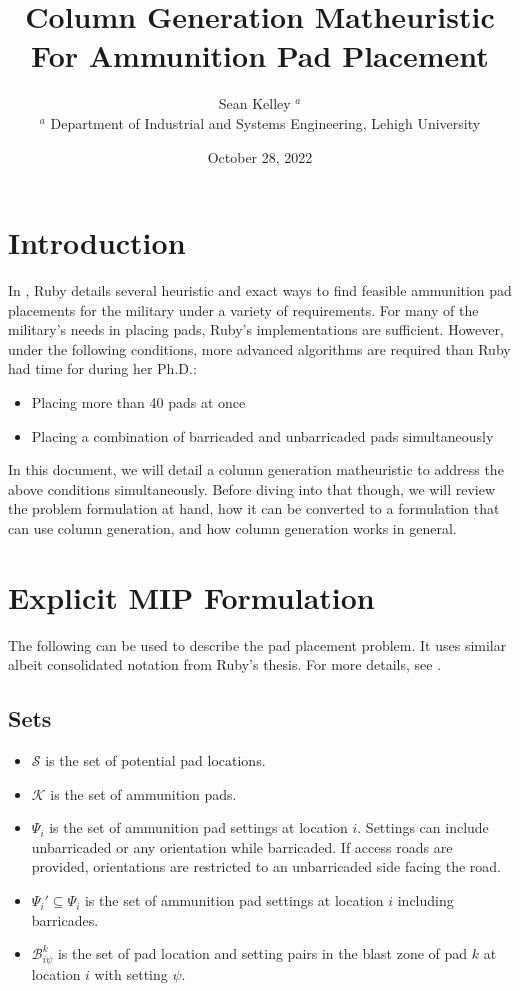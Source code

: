 \documentclass[10pt]{article}
\begin{document}
	\title{Column Generation Matheuristic For Ammunition Pad Placement}
	\author{Sean Kelley $^a$ \\
		$^a$ Department of Industrial and Systems Engineering, Lehigh University}
	\date{October 28, 2022}
	\maketitle
	
	\section{Introduction}
	In \cite{ruby}, Ruby details several heuristic and exact ways to find feasible ammunition pad placements for the military under a variety of requirements. For many of the military's needs in placing pads, Ruby's implementations are sufficient. However, under the following conditions, more advanced algorithms are required than Ruby had time for during her Ph.D.:
	\begin{itemize}
		\item Placing more than 40 pads at once
		\item Placing a combination of barricaded and unbarricaded pads simultaneously
	\end{itemize}
	In this document, we will detail a column generation matheuristic to address the above conditions simultaneously. Before diving into that though, we will review the problem formulation at hand, how it can be converted to a formulation that can use column generation, and how column generation works in general.
	
	\section{Explicit MIP Formulation}
	The following can be used to describe the pad placement problem. It uses similar albeit consolidated notation from Ruby's thesis. For more details, see \cite{ruby}.

	\subsection{Sets}
	\begin{itemize}
		\item $\mathcal{S}$ is the set of potential pad locations.
		\item $\mathcal{K}$ is the set of ammunition pads.
		\item $\Psi_i$ is the set of ammunition pad settings at location $ i $. Settings can include unbarricaded or any orientation while barricaded. If access roads are provided, orientations are restricted to an unbarricaded side facing the road.
		\item $\Psi_i' \subseteq \Psi_i$ is the set of ammunition pad settings at location $ i $ including barricades.
		\item $ \mathcal{B}_{i\psi}^{k} $ is the set of pad location and setting pairs in the blast zone of pad $ k $ at location $ i $ with setting $ \psi $. 
	\end{itemize}
	
\end{document}
